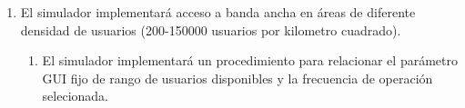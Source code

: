         \begin{enumerate}
            \item El simulador implementará acceso a banda ancha en áreas de diferente densidad de usuarios (200-150000 usuarios por kilometro cuadrado). %
                \begin{enumerate}
                    \item El simulador implementará un procedimiento para relacionar el parámetro GUI fijo de rango de usuarios disponibles y la frecuencia de operación selecionada.  %
                \end{enumerate}
            

\end{enumerate}
